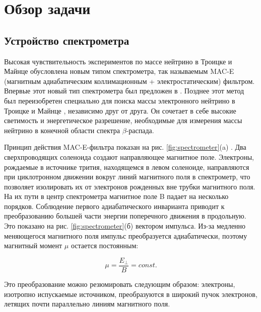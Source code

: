 \documentclass[a4paper,14pt]{extarticle}
\begin{document}
     



    \newpage
    \section{Обзор задачи}
    \subsection{Устройство спектрометра}
    Высокая чувствительность экспериментов по массе нейтрино в Троицке и Майнце обусловлена
    новым типом спектрометра, так называемым MAC-E (магнитным адиабатическим коллимационным
    + электростатическим) фильтром. Впервые этот новый тип спектрометра был предложен
    в \cite{Beamson_1980}. Позднее этот метод был переизобретен специально для поиска массы электронного
    нейтрино в Троицке и Майнце \cite{lobashev} \cite{picard}, независимо друг от друга. Он сочетает в 
    себе высокие светимость и энергетическое разрешение, необходимые для измерения 
    массы нейтрино в конечной области спектра $\beta$-распада.
    
    Принцип действия MAC-E-фильтра показан на рис. \ref{fig:spectrometer}(a) \cite{design_report}. 
    Два сверхпроводящих соленоида создают направляющее магнитное поле. Электроны, рождаемые в источнике
    трития, находящемся в левом соленоиде, направляются при
    циклотронном движении вокруг линий магнитного поля в спектрометр, что позволяет изолировать их 
    от электронов рожденных вне трубки магнитного поля. На их пути в центр спектрометра
    магнитное поле B падает на несколько порядков. Соблюдение первого адиабатического инварианта приводит 
    к преобразованию большей части энергии поперечного движения в продольную. Это
    показано на рис. \ref{fig:spectrometer}(б) вектором импульса. Из-за медленно меняющегося магнитного 
    поля импульс преобразуется адиабатически, поэтому магнитный момент $\mu$ остается постоянным:
    
    \begin{equation}\label{adiabat}
        \mu = \frac{E_\perp}{B} = const.
    \end{equation}
    
    Это преобразование можно резюмировать следующим образом: электроны, изотропно испускаемые
    источником, преобразуются в широкий пучок электронов, летящих почти параллельно линиям
    магнитного поля.
    
\end{document}
